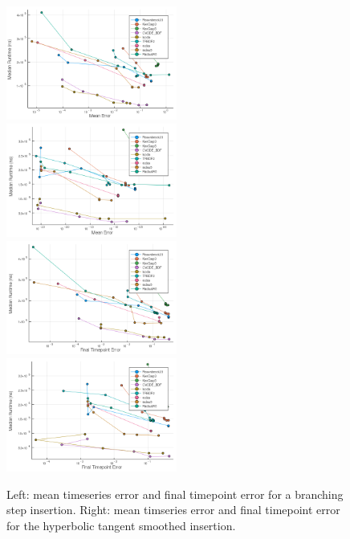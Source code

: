 \documentclass[review,onefignum,onetabnum]{siamart171218}
\begin{document}
\begin{figure}[htb]
  \includegraphics[width=0.5\textwidth]{../plots/work-precision/-high_tolerance_100pcm.png}
  \includegraphics[width=0.5\textwidth]{../plots/work-precision/-high_tolerance_100pcm_tanh.png}
  \includegraphics[width=0.5\textwidth]{../plots/work-precision/final_tp-high_tolerance_100pcm.png}
  \includegraphics[width=0.5\textwidth]{../plots/work-precision/final_tp-high_tolerance_100pcm_tanh.png}
  \caption{Left: mean timeseries error and final timepoint error for a branching step insertion. Right: mean timseries error and final timepoint error for the hyperbolic tangent smoothed insertion. }
  \label{fig:high-tol-both}
\end{figure}
\end{document}
